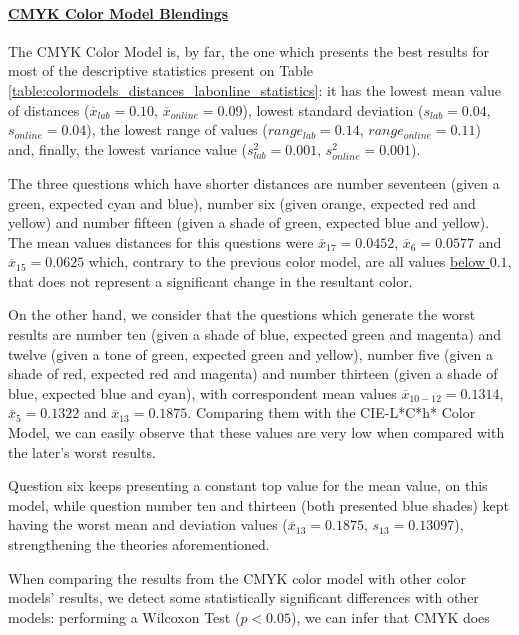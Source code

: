 \paragraph{\ul{CMYK Color Model Blendings}}
\label{par:cmykcolormodel}
%
The CMYK Color Model is, by far, the one which presents the best results for most of the descriptive statistics present on Table \ref{table:colormodels_distances_labonline_statistics}: it has the lowest mean value of distances ($\overline{x}_{lab} = 0.10$, $\overline{x}_{online} = 0.09$), lowest standard deviation ($s_{lab} = 0.04$, $s_{online} = 0.04$),
the lowest range of values ($range_{lab} = 0.14$, $range_{online} = 0.11$) and, finally, the lowest variance value ($s^2_{lab} = 0.001$, $s^2_{online} = 0.001$). \par
%
The three questions which have shorter distances are number seventeen (given a green, expected cyan and blue), number six (given orange, expected red and yellow) and number fifteen (given a shade of green, expected blue
and yellow). The mean values distances for this questions were $\overline{x}_{17} = 0.0452$, $\overline{x}_{6} = 0.0577$ and $\overline{x}_{15} = 0.0625$ which, contrary to the previous color model, are all values \ul{below $0.1$},
that does not represent a significant change in the resultant color. \par
%
On the other hand, we consider that the questions which generate the worst results are number ten (given a shade of blue, expected green and magenta) and twelve (given a tone of green, expected green and yellow), number five
(given a shade of red, expected red and magenta) and number thirteen (given a shade of blue, expected blue and cyan), with correspondent mean values $\overline{x}_{10-12} = 0.1314$, $\overline{x}_{5} = 0.1322$ and
$\overline{x}_{13} = 0.1875$. Comparing them with the CIE-L*C*h* Color Model, we can easily observe that these values are very low when compared with the later's worst results. \par
%
Question six keeps presenting a constant top value for the mean value, on this model, while question number ten and thirteen (both presented blue shades) kept having the worst mean and deviation values ($\overline{x}_{13} = 0.1875$,
$s_{13} = 0.13097$), strengthening the theories aforementioned. \par
%
When comparing the results from the CMYK color model with other color models' results, we detect some statistically significant differences with other models: performing a Wilcoxon Test ($p < 0.05$), we can infer that CMYK does
